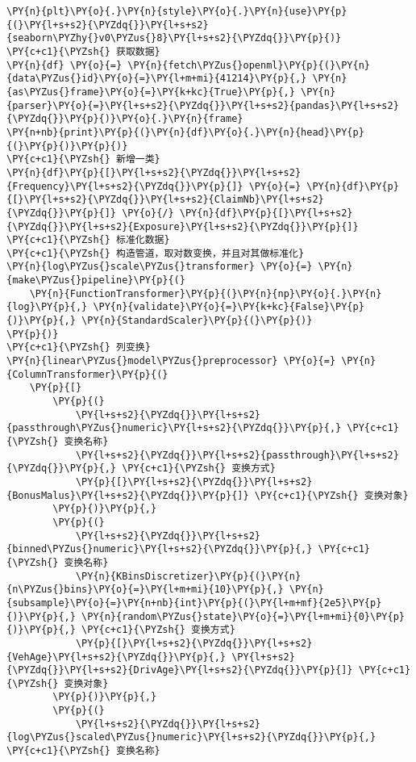 \begin{Verbatim}[commandchars=\\\{\}]
\PY{n}{plt}\PY{o}{.}\PY{n}{style}\PY{o}{.}\PY{n}{use}\PY{p}{(}\PY{l+s+s2}{\PYZdq{}}\PY{l+s+s2}{seaborn\PYZhy{}v0\PYZus{}8}\PY{l+s+s2}{\PYZdq{}}\PY{p}{)}
\PY{c+c1}{\PYZsh{} 获取数据}
\PY{n}{df} \PY{o}{=} \PY{n}{fetch\PYZus{}openml}\PY{p}{(}\PY{n}{data\PYZus{}id}\PY{o}{=}\PY{l+m+mi}{41214}\PY{p}{,} \PY{n}{as\PYZus{}frame}\PY{o}{=}\PY{k+kc}{True}\PY{p}{,} \PY{n}{parser}\PY{o}{=}\PY{l+s+s2}{\PYZdq{}}\PY{l+s+s2}{pandas}\PY{l+s+s2}{\PYZdq{}}\PY{p}{)}\PY{o}{.}\PY{n}{frame}
\PY{n+nb}{print}\PY{p}{(}\PY{n}{df}\PY{o}{.}\PY{n}{head}\PY{p}{(}\PY{p}{)}\PY{p}{)}
\PY{c+c1}{\PYZsh{} 新增一类}
\PY{n}{df}\PY{p}{[}\PY{l+s+s2}{\PYZdq{}}\PY{l+s+s2}{Frequency}\PY{l+s+s2}{\PYZdq{}}\PY{p}{]} \PY{o}{=} \PY{n}{df}\PY{p}{[}\PY{l+s+s2}{\PYZdq{}}\PY{l+s+s2}{ClaimNb}\PY{l+s+s2}{\PYZdq{}}\PY{p}{]} \PY{o}{/} \PY{n}{df}\PY{p}{[}\PY{l+s+s2}{\PYZdq{}}\PY{l+s+s2}{Exposure}\PY{l+s+s2}{\PYZdq{}}\PY{p}{]}
\PY{c+c1}{\PYZsh{} 标准化数据}
\PY{c+c1}{\PYZsh{} 构造管道，取对数变换，并且对其做标准化}
\PY{n}{log\PYZus{}scale\PYZus{}transformer} \PY{o}{=} \PY{n}{make\PYZus{}pipeline}\PY{p}{(}
    \PY{n}{FunctionTransformer}\PY{p}{(}\PY{n}{np}\PY{o}{.}\PY{n}{log}\PY{p}{,} \PY{n}{validate}\PY{o}{=}\PY{k+kc}{False}\PY{p}{)}\PY{p}{,} \PY{n}{StandardScaler}\PY{p}{(}\PY{p}{)}
\PY{p}{)}
\PY{c+c1}{\PYZsh{} 列变换}
\PY{n}{linear\PYZus{}model\PYZus{}preprocessor} \PY{o}{=} \PY{n}{ColumnTransformer}\PY{p}{(}
    \PY{p}{[}
        \PY{p}{(}
            \PY{l+s+s2}{\PYZdq{}}\PY{l+s+s2}{passthrough\PYZus{}numeric}\PY{l+s+s2}{\PYZdq{}}\PY{p}{,} \PY{c+c1}{\PYZsh{} 变换名称}
            \PY{l+s+s2}{\PYZdq{}}\PY{l+s+s2}{passthrough}\PY{l+s+s2}{\PYZdq{}}\PY{p}{,} \PY{c+c1}{\PYZsh{} 变换方式}
            \PY{p}{[}\PY{l+s+s2}{\PYZdq{}}\PY{l+s+s2}{BonusMalus}\PY{l+s+s2}{\PYZdq{}}\PY{p}{]} \PY{c+c1}{\PYZsh{} 变换对象}
        \PY{p}{)}\PY{p}{,}
        \PY{p}{(}
            \PY{l+s+s2}{\PYZdq{}}\PY{l+s+s2}{binned\PYZus{}numeric}\PY{l+s+s2}{\PYZdq{}}\PY{p}{,} \PY{c+c1}{\PYZsh{} 变换名称}
            \PY{n}{KBinsDiscretizer}\PY{p}{(}\PY{n}{n\PYZus{}bins}\PY{o}{=}\PY{l+m+mi}{10}\PY{p}{,} \PY{n}{subsample}\PY{o}{=}\PY{n+nb}{int}\PY{p}{(}\PY{l+m+mf}{2e5}\PY{p}{)}\PY{p}{,} \PY{n}{random\PYZus{}state}\PY{o}{=}\PY{l+m+mi}{0}\PY{p}{)}\PY{p}{,} \PY{c+c1}{\PYZsh{} 变换方式}
            \PY{p}{[}\PY{l+s+s2}{\PYZdq{}}\PY{l+s+s2}{VehAge}\PY{l+s+s2}{\PYZdq{}}\PY{p}{,} \PY{l+s+s2}{\PYZdq{}}\PY{l+s+s2}{DrivAge}\PY{l+s+s2}{\PYZdq{}}\PY{p}{]} \PY{c+c1}{\PYZsh{} 变换对象}
        \PY{p}{)}\PY{p}{,}
        \PY{p}{(}
            \PY{l+s+s2}{\PYZdq{}}\PY{l+s+s2}{log\PYZus{}scaled\PYZus{}numeric}\PY{l+s+s2}{\PYZdq{}}\PY{p}{,} \PY{c+c1}{\PYZsh{} 变换名称}

\end{Verbatim}
